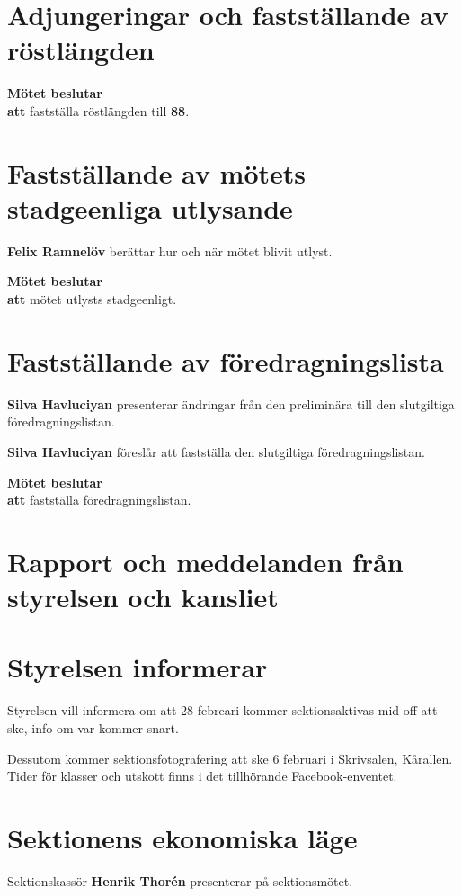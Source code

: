 \documentclass{datateknologsektionen-document}
\newcommand{\ind}{\hspace*{2em}}
\newcommand{\motetbeslutar}{\textbf{Mötet beslutar}}
\newcommand{\att}{\\\ind\textbf{att}}
\newcommand{\rostlangd}[1]{\motetbeslutar\att{} fastställa röstlängden till \textbf{#1}.}
\begin{document}
\section{Adjungeringar och fastställande av röstlängden}



\rostlangd{88}



\section{Fastställande av mötets stadgeenliga utlysande}
\textbf{Felix Ramnelöv} berättar hur och när mötet blivit utlyst.

\motetbeslutar\att{} mötet utlysts stadgeenligt.



\section{Fastställande av föredragningslista}
\textbf{Silva Havluciyan} presenterar ändringar från den preliminära till den slutgiltiga föredragningslistan.

\textbf{Silva Havluciyan} föreslår att fastställa den slutgiltiga föredragningslistan.

\motetbeslutar\att{} fastställa föredragningslistan.
\pagebreak


\section{Rapport och meddelanden från styrelsen och kansliet}



\section{Styrelsen informerar}
Styrelsen vill informera om att 28 febreari kommer sektionsaktivas mid-off att ske, info om var kommer snart.

Dessutom kommer sektionsfotografering att ske 6 februari i Skrivsalen, Kårallen. Tider för klasser och utskott finns i det tillhörande Facebook-enventet.

\section{Sektionens ekonomiska läge}
Sektionskassör \textbf{Henrik Thorén} presenterar på sektionsmötet.
\end{document}
